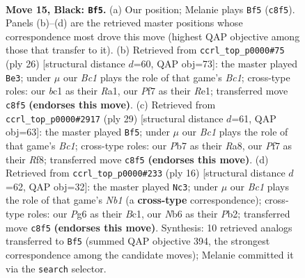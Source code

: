 \documentclass[11pt]{article}
\begin{document}
\clearpage

\begin{figure}[p]\centering
\begin{subfigure}{0.46\textwidth}\centering
\resizebox{\linewidth}{!}{%
\newchessgame
\chessboard[
  setfen={rnb1r1k1/pp3pbp/1n3qp1/3p4/3P4/1B5P/PPN2PP1/RNBQ1RK1 b - - 2 15},
  showmover=false,
  pgfstyle=straightmove, color=movearrow, markmove={c8-f5}
]}
\caption{}
\end{subfigure}\hfill
\begin{subfigure}{0.46\textwidth}\centering
\resizebox{\linewidth}{!}{%
\newchessgame
\chessboard[
  setfen={r1bqr1k1/pp3pp1/3bpn1p/8/3P4/2N3P1/PP2QPBP/R1B1R1K1 w - - 2 14},
  showmover=false,
  pgfstyle=straightmove, color=movearrow, markmove={c1-e3}
]}
\caption{}
\end{subfigure}
\\[4pt]
\begin{subfigure}{0.46\textwidth}\centering
\resizebox{\linewidth}{!}{%
\newchessgame
\chessboard[
  setfen={r1bq1rk1/pp3pbp/6p1/2pPn3/Pn2N3/N5PP/1P3PB1/R1BQ1RK1 b - - 2 15},
  showmover=false,
  pgfstyle=straightmove, color=movearrow, markmove={c8-f5}
]}
\caption{}
\end{subfigure}\hfill
\begin{subfigure}{0.46\textwidth}\centering
\resizebox{\linewidth}{!}{%
\newchessgame
\chessboard[
  setfen={rnbq1rk1/pp2bppp/5n2/3p4/3Q4/5NP1/PP2PPBP/RNB2RK1 w - - 4 9},
  showmover=false,
  pgfstyle=straightmove, color=movearrow, markmove={b1-c3}
]}
\caption{}
\end{subfigure}
\caption{\textbf{Move 15, Black: \texttt{Bf5}.} (a) Our position; Melanie plays \texttt{Bf5} (\texttt{c8f5}). Panels (b)--(d) are the retrieved master positions whose correspondence most drove this move (highest QAP objective among those that transfer to it). (b) Retrieved from \texttt{ccrl\_top\_p0000\#75} (ply 26) [structural distance $d$=60, QAP obj=73]: the master played \texttt{Be3}; under $\mu$ our \emph{Bc1} plays the role of that game's \emph{Bc1}; cross-type roles: our \emph{b}c1 as their \emph{R}a1, our \emph{P}f7 as their \emph{R}e1; transferred move \texttt{c8f5} \textbf{(endorses this move)}. (c) Retrieved from \texttt{ccrl\_top\_p0000\#2917} (ply 29) [structural distance $d$=61, QAP obj=63]: the master played \texttt{Bf5}; under $\mu$ our \emph{Bc1} plays the role of that game's \emph{Bc1}; cross-type roles: our \emph{P}b7 as their \emph{R}a8, our \emph{P}f7 as their \emph{R}f8; transferred move \texttt{c8f5} \textbf{(endorses this move)}. (d) Retrieved from \texttt{ccrl\_top\_p0000\#233} (ply 16) [structural distance $d$=62, QAP obj=32]: the master played \texttt{Nc3}; under $\mu$ our \emph{Bc1} plays the role of that game's \emph{Nb1} (a \textbf{cross-type} correspondence); cross-type roles: our \emph{P}g6 as their \emph{B}c1, our \emph{N}b6 as their \emph{P}b2; transferred move \texttt{c8f5} \textbf{(endorses this move)}. Synthesis: 10 retrieved analogs transferred to \texttt{Bf5} (summed QAP objective 394, the strongest correspondence among the candidate moves); Melanie committed it via the \texttt{search} selector.}
\label{fig:thought-m29}
\end{figure}
\end{document}
